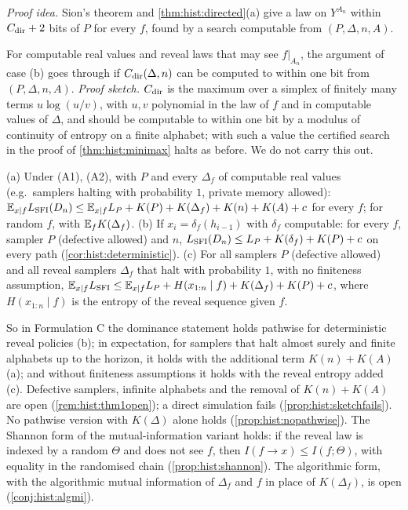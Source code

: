 \emph{Proof idea.} Sion's theorem \citep{sion1958general} and \cref{thm:hist:directed}(a) give a law on $Y^{A_n}$ within $C_{\rm dir}+2$ bits of $P$ for every $f$, found by a search computable from $(P,\Delta,n,A)$.

\begin{remark}\label{rem:hist:minimaxsketch}
For computable real values and reveal laws that may see $f|_{A_n}$, the argument of case (b) goes through if $C_{\rm dir}(\Delta,n)$ can be computed to within one bit from $(P,\Delta,n,A)$. \emph{Proof sketch.} $C_{\rm dir}$ is the maximum over a simplex of finitely many terms $u\log(u/v)$, with $u,v$ polynomial in the law of $f$ and in computable values of $\Delta$, and should be computable to within one bit by a modulus of continuity of entropy on a finite alphabet; with such a value the certified search in the proof of \cref{thm:hist:minimax} halts as before. We do not carry this out.
\end{remark}

\begin{corollary}\label{cor:hist:thm1}
(a) Under (A1), (A2), with $P$ and every $\Delta_f$ of computable real values (e.g.\ samplers halting with probability $1$, private memory allowed): $\mathbb{E}_{x\mid f}L_{\mathrm{SFI}}(D_n)\le\mathbb{E}_{x\mid f}L_P+K(P)+K(\Delta_f)+K(n)+K(A)+c$ for every $f$; for random $f$, with $\mathbb{E}_fK(\Delta_f)$.
(b) If $x_i=\delta_f(h_{i-1})$ with $\delta_f$ computable: for every $f$, sampler $P$ (defective allowed) and $n$, $L_{\mathrm{SFI}}(D_n)\le L_P+K(\delta_f)+K(P)+c$ on every path (\cref{cor:hist:deterministic}).
(c) For all samplers $P$ (defective allowed) and all reveal samplers $\Delta_f$ that halt with probability $1$, with no finiteness assumption, $\mathbb{E}_{x\mid f}L_{\mathrm{SFI}}\le\mathbb{E}_{x\mid f}L_P+H(x_{1:n}\mid f)+K(\Delta_f)+K(P)+c$, where $H(x_{1:n}\mid f)$ is the entropy of the reveal sequence given $f$.
\end{corollary}

So in Formulation C the dominance statement holds pathwise for deterministic reveal policies (b); in expectation, for samplers that halt almost surely and finite alphabets up to the horizon, it holds with the additional term $K(n)+K(A)$ (a); and without finiteness assumptions it holds with the reveal entropy added (c). Defective samplers, infinite alphabets and the removal of $K(n)+K(A)$ are open (\cref{rem:hist:thm1open}); a direct simulation fails (\cref{prop:hist:sketchfails}). No pathwise version with $K(\Delta)$ alone holds (\cref{prop:hist:nopathwise}). The Shannon form of the mutual-information variant holds: if the reveal law is indexed by a random $\Theta$ and does not see $f$, then $I(f\to x)\le I(f;\Theta)$, with equality in the randomised chain (\cref{prop:hist:shannon}). The algorithmic form, with the algorithmic mutual information of $\Delta_f$ and $f$ in place of $K(\Delta_f)$, is open (\cref{conj:hist:algmi}).

